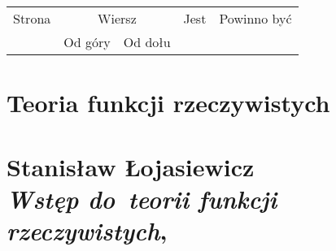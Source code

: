 \documentclass[a4paper,11pt]{article}
\numberwithin{equation}{section}
\begin{document}
\newpage



\begin{center}

  \begin{tabular}{|c|c|c|c|c|}
    \hline
    Strona & \multicolumn{2}{c|}{Wiersz} & Jest
                              & Powinno być \\ \cline{2-3}
    & Od góry & Od dołu & & \\
    \hline
    \hline
  \end{tabular}

\end{center}

\VerSpaceTwo
























\newpage

\section{Teoria funkcji rzeczywistych}

\VerSpaceTwo



\section{ %
  Stanisław Łojasiewicz \\
  \textit{Wstęp do~teorii funkcji rzeczywistych},
  \cite{LojasiewiczWstepDoTeoriiFunkcjiRzeczywistych1976}}

\vspace{0em}


\end{document}
